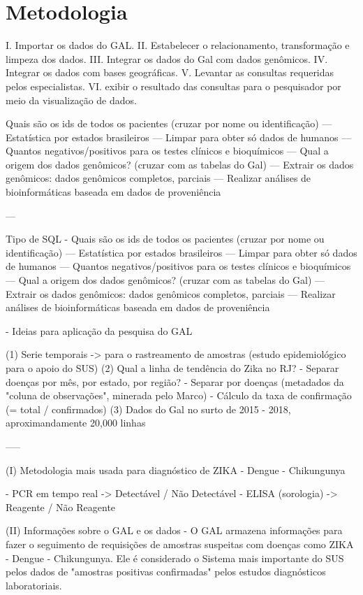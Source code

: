 \chapter{Metodologia}

I.	Importar os dados do GAL.
II.	Estabelecer o relacionamento, transformação e limpeza dos dados.
III.	Integrar os dados do Gal com dados genômicos.
IV.	Integrar os dados com bases geográficas.
V.	Levantar as consultas requeridas pelos especialistas.
VI.	exibir o resultado das consultas para o pesquisador por meio da visualização de dados.


Quais são os ids de todos os pacientes (cruzar por nome ou identificação)
---	Estatística por estados brasileiros
---	Limpar para obter só dados de humanos
---	Quantos negativos/positivos para os testes clínicos e bioquímicos
---	Qual a origem dos dados genômicos? (cruzar com as tabelas do Gal)
---	Extrair os dados genômicos: dados genômicos completos, parciais
---	Realizar análises de bioinformáticas baseada em dados de proveniência


---

Tipo de SQL	- Quais são os ids de todos os pacientes (cruzar por nome ou identificação)
---	Estatística por estados brasileiros
---	Limpar para obter só dados de humanos
---	Quantos negativos/positivos para os testes clínicos e bioquímicos
---	Qual a origem dos dados genômicos? (cruzar com as tabelas do Gal)
---	Extrair os dados genômicos: dados genômicos completos, parciais
---	Realizar análises de bioinformáticas baseada em dados de proveniência


- Ideias para aplicação da pesquisa do GAL

	(1) Serie temporais -> para o rastreamento de amostras (estudo epidemiológico para o apoio do SUS)
	(2) Qual a linha de tendência do Zika no RJ? 
		- Separar doenças por mês, por estado, por região?
		- Separar por doenças (metadados da "coluna de observações", minerada pelo Marco)
		- Cálculo da taxa de confirmação (= total / confirmados)
	(3) Dados do Gal no surto de 2015 - 2018, aproximandamente 20,000 linhas

	-----
	
	
(I) Metodologia mais usada para diagnóstico de ZIKA - Dengue - Chikungunya

- PCR em tempo real -> Detectável / Não Detectável
- ELISA (sorologia) -> Reagente / Não Reagente

(II) Informações sobre o GAL e os dados
- O GAL armazena informações para fazer o seguimento de requisições de amostras suspeitas com doenças como ZIKA - Dengue - Chikungunya. Ele é considerado o Sistema mais importante do SUS pelos dados de "amostras positivas confirmadas" pelos estudos diagnósticos laboratoriais.

